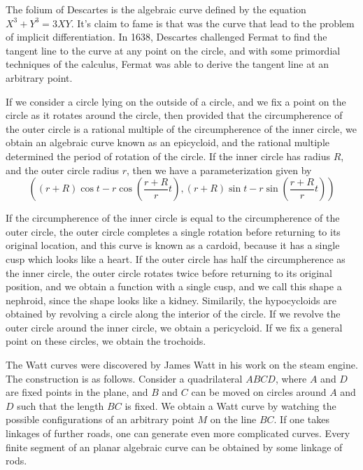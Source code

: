 \begin{example}
    The folium of Descartes is the algebraic curve defined by the equation $X^3 + Y^3 = 3XY$. It's claim to fame is that was the curve that lead to the problem of implicit differentiation. In 1638, Descartes challenged Fermat to find the tangent line to the curve at any point on the circle, and with some primordial techniques of the calculus, Fermat was able to derive the tangent line at an arbitrary point.
\end{example}

\begin{example}
    If we consider a circle lying on the outside of a circle, and we fix a point on the circle as it rotates around the circle, then provided that the circumpherence of the outer circle is a rational multiple of the circumpherence of the inner circle, we obtain an algebraic curve known as an epicycloid, and the rational multiple determined the period of rotation of the circle. If the inner circle has radius $R$, and the outer circle radius $r$, then we have a parameterization given by
    \[ \left( (r + R) \cos t - r \cos \left(\frac{r + R}{r}t \right), (r + R) \sin t - r \sin \left( \frac{r + R}{r}t \right) \right) \]



    If the circumpherence of the inner circle is equal to the circumpherence of the outer circle, the outer circle completes a single rotation before returning to its original location, and this curve is known as a cardoid, because it has a single cusp which looks like a heart. If the outer circle has half the circumpherence as the inner circle, the outer circle rotates twice before returning to its original position, and we obtain a function with a single cusp, and we call this shape a nephroid, since the shape looks like a kidney. Similarily, the hypocycloids are obtained by revolving a circle along the interior of the circle. If we revolve the outer circle around the inner circle, we obtain a pericycloid. If we fix a general point on these circles, we obtain the trochoids.
\end{example}

\begin{example}
    The Watt curves were discovered by James Watt in his work on the steam engine. The construction is as follows. Consider a quadrilateral $ABCD$, where $A$ and $D$ are fixed points in the plane, and $B$ and $C$ can be moved on circles around $A$ and $D$ such that the length $BC$ is fixed. We obtain a Watt curve by watching the possible configurations of an arbitrary point $M$ on the line $BC$. If one takes linkages of further roads, one can generate even more complicated curves. Every finite segment of an planar algebraic curve can be obtained by some linkage of rods.
\end{example}


